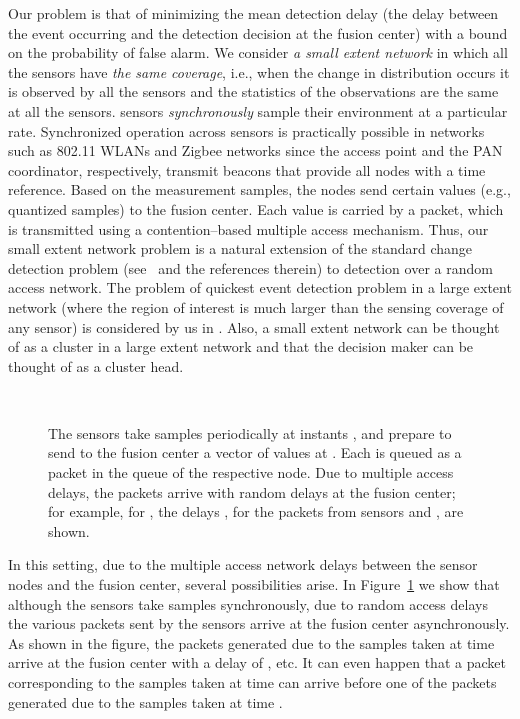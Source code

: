 \documentclass[acmtosn]{acmtrans2m}
\begin{document}
Our problem is that of minimizing the mean detection delay (the delay
between the event occurring and the detection decision at the fusion
center) with a bound on the probability of false alarm. We consider
\emph{a small extent network} in which all the sensors have {\em the
same coverage}, i.e., when the change in distribution occurs it is
observed by all the sensors and the statistics of the observations are
the same at all the sensors.  sensors \emph{synchronously} sample
their environment at a particular rate. Synchronized operation across
sensors is practically possible in networks such as 802.11 WLANs and
Zigbee networks since the access point and the PAN coordinator,
respectively, transmit beacons that provide all nodes with a time
reference. Based on the measurement samples, the nodes send certain
values (e.g., quantized samples) to the fusion center. Each value is
carried by a packet, which is transmitted using a contention--based
multiple access mechanism. Thus, our small extent network problem is a
natural extension of the standard change detection problem
(see~\cite{veeravalli01decentralized-quickest} and the references
therein) to detection over a random access network. The problem of
quickest event detection problem in a large extent network (where the
region of interest is much larger than the sensing coverage of any
sensor) is considered by us in \cite{premkumar-etal09distributed-det}.
Also, a small extent network can be thought of as a cluster in a large
extent network and that the decision maker can be thought of as a
cluster head. 


\begin{figure}[t]
   \centering \
   \caption{The sensors take samples periodically at instants , and prepare to send to the fusion center a vector
     of values  
     at . Each is queued as a packet in
     the queue of the respective node. Due to multiple access delays,
     the packets arrive with random delays at the fusion center; for
     example, for , the delays , for the packets from sensors  and , are
     shown. }
   \label{fig:samples_with_mac_delays}
\end{figure}

In this setting, due to the multiple access network delays between the
sensor nodes and the fusion center, several possibilities arise. In
Figure~\ref{fig:samples_with_mac_delays} we show that although the
sensors take samples synchronously, due to random access delays
the various packets sent by the sensors arrive at the fusion center
asynchronously. As shown in the figure, the packets generated due to
the samples taken at time  arrive at the fusion center with a 
delay of , etc. It can even happen 
that a packet corresponding to the samples taken at time  can 
arrive before one of the packets generated due to the samples taken 
at time . 
\end{document}
